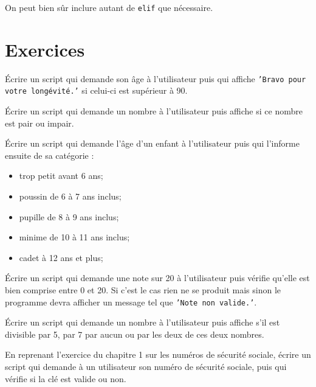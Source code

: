 On peut bien sûr inclure autant de \texttt{elif} que nécessaire.

\section{Exercices}

\begin{exercice}
	\'Ecrire un script qui demande son âge à l'utilisateur puis qui affiche \texttt{'Bravo pour votre longévité.'} si celui-ci est supérieur à 90.
\end{exercice}

\begin{exercice}[]
	\'Ecrire un script qui demande un nombre à l'utilisateur puis affiche si ce nombre est pair ou impair.
\end{exercice}
\begin{exercice}
	\'Ecrire un script qui demande l'âge d'un enfant à l'utilisateur puis qui l'informe ensuite de sa catégorie :
	\begin{itemize}
		\item   trop petit avant 6 ans;
		\item   poussin de 6 à 7 ans inclus;
		\item   pupille de 8 à 9 ans inclus;
		\item   minime de 10 à 11 ans inclus;
		\item   cadet à 12 ans et plus;
	\end{itemize}
\end{exercice}

\begin{exercice}
	\'Ecrire un script qui demande une note sur 20 à l'utilisateur puis vérifie qu'elle est bien comprise entre 0 et 20. Si c'est le cas rien ne se produit mais sinon le programme devra afficher un message tel que \texttt{'Note non valide.'}.
\end{exercice}

\begin{exercice}
	\'Ecrire un script qui demande un nombre à l'utilisateur puis affiche s'il est divisible par 5, par 7 par aucun ou par les deux de ces deux nombres.
\end{exercice}
\begin{exercice}
	En reprenant l'exercice du chapitre 1 sur les numéros de sécurité sociale, écrire un script qui demande à un utilisateur son numéro de sécurité sociale, puis qui vérifie si la clé est valide ou non.
\end{exercice}


